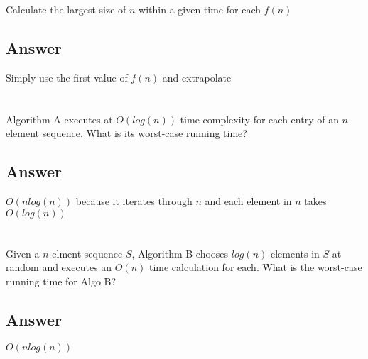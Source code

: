\documentclass{article}
\begin{document}
Calculate the largest size of \(n\) within a given time for each \(f(n)\)

\subsection{Answer}

\begin{mdframed}

  Simply use the first value of \(f(n)\) and extrapolate

\end{mdframed}


\section{}

Algorithm A executes at \(O(log(n))\) time complexity for each entry of an
\(n\)-element sequence. What is its worst-case running time?

\subsection{Answer}

\begin{mdframed}

  \(O(nlog(n))\) because it iterates through \(n\) and each element in \(n\)
  takes \(O(log(n))\)

\end{mdframed}


\section{}

Given a \(n\)-elment sequence \(S\), Algorithm B chooses \(log(n)\) elements in
\(S\) at random and executes an \(O(n)\) time calculation for each. What is the
worst-case running time for Algo B?

\subsection{Answer}

\begin{mdframed}

  \(O(nlog(n))\) 


\end{mdframed}

\section{}
\end{document}
